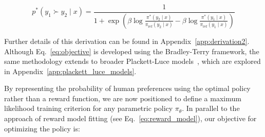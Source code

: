 \begin{equation}\label{eq:objective}
    p^*(y_1\succ y_2 \mid x)=\frac{1}{1 + \exp\left(\beta \log \frac{\pi^*(y_2\mid x)}{\pi_\text{ref}(y_2\mid x)} - \beta \log \frac{\pi^*(y_1\mid x)}{\pi_\text{ref}(y_1\mid x)}\right)}
\end{equation}

Further details of this derivation can be found in Appendix~\ref{app:derivation2}. Although Eq.~\ref{eq:objective} is developed using the Bradley-Terry framework, the same methodology extends to broader Plackett-Luce models~\citep{plackett1975analysis, luce2012individual}, which are explored in Appendix~\ref{app:plackett_luce_models}.

By representing the probability of human preferences using the optimal policy rather than a reward function, we are now positioned to define a maximum likelihood training criterion for any parametric policy $\pi_\theta$. In parallel to the approach of reward model fitting (see Eq.~\ref{eq:reward_model}), our objective for optimizing the policy is:

